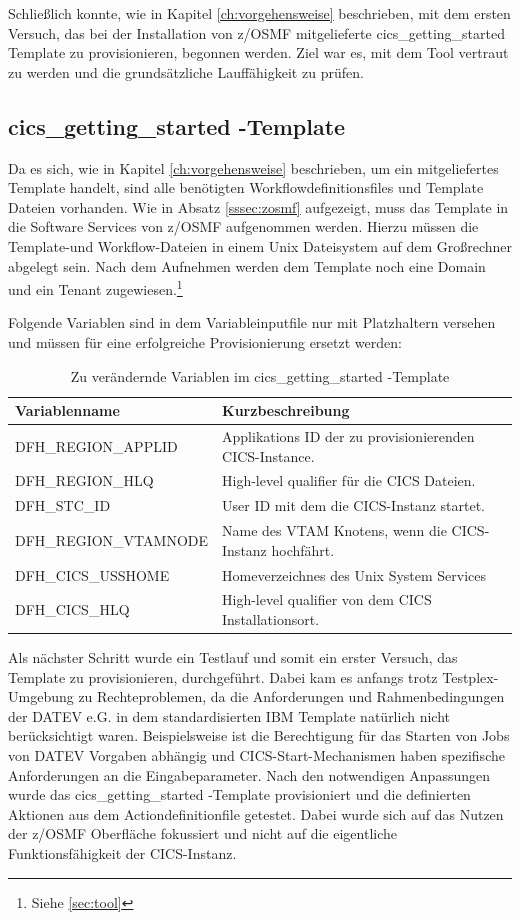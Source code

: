 Schließlich konnte, wie in Kapitel \ref{ch:vorgehensweise} beschrieben, mit dem ersten Versuch, das bei der Installation von z/OSMF mitgelieferte \glqq cics\_getting\_started\grqq{} Template zu provisionieren, begonnen werden.
Ziel war es, mit dem Tool vertraut zu werden und die grundsätzliche Lauffähigkeit zu prüfen.

\subsection{\glqq cics\_getting\_started \grqq-Template}\label{ssec:cgs}
Da es sich, wie in Kapitel \ref{ch:vorgehensweise} beschrieben, um ein mitgeliefertes Template handelt, sind alle benötigten Workflowdefinitionsfiles und Template Dateien vorhanden.
Wie in Absatz \ref{sssec:zosmf} aufgezeigt, muss das Template in die Software Services von z/OSMF aufgenommen werden.
Hierzu müssen die Template-und Workflow-Dateien in einem Unix Dateisystem auf dem Großrechner abgelegt sein. 
Nach dem Aufnehmen werden dem Template noch eine Domain und ein Tenant zugewiesen.\footnote{Siehe \ref{sec:tool}}

Folgende Variablen sind in dem Variableinputfile nur mit Platzhaltern versehen und müssen für eine erfolgreiche Provisionierung ersetzt werden:
\begin{table}[h]
\centering
\begin{tabularx}{\textwidth}{X|X}
Variablenname & Kurzbeschreibung \\
\hline
DFH\_REGION\_APPLID & Applikations ID der zu provisionierenden CICS-Instance. \\
\hline
DFH\_REGION\_HLQ & High-level qualifier für die CICS Dateien.\\
\hline
DFH\_STC\_ID & User ID mit dem die CICS-Instanz startet. \\
\hline
DFH\_REGION\_VTAMNODE & Name des VTAM Knotens, wenn die CICS-Instanz hochfährt. \\
\hline
DFH\_CICS\_USSHOME & Homeverzeichnes des Unix System Services \\
\hline
DFH\_CICS\_HLQ & High-level qualifier von dem CICS Installationsort. \\
\end{tabularx}
\caption{Zu verändernde Variablen im \glqq cics\_getting\_started \grqq-Template}
\label{tab:cgsvars}
\end{table}

Als nächster Schritt wurde ein Testlauf und somit ein erster Versuch, das Template zu provisionieren, durchgeführt.
Dabei kam es anfangs trotz Testplex-Umgebung zu Rechteproblemen, da die Anforderungen und Rahmenbedingungen der DATEV e.G. in dem standardisierten IBM Template natürlich nicht berücksichtigt waren.
Beispielsweise ist die Berechtigung für das Starten von Jobs von DATEV Vorgaben abhängig und CICS-Start-Mechanismen haben spezifische Anforderungen an die Eingabeparameter.
Nach den notwendigen Anpassungen wurde das \glqq cics\_getting\_started \grqq-Template provisioniert und die definierten Aktionen aus dem Actiondefinitionfile getestet.
Dabei wurde sich auf das Nutzen der z/OSMF Oberfläche fokussiert und nicht auf die eigentliche Funktionsfähigkeit der CICS-Instanz. 

